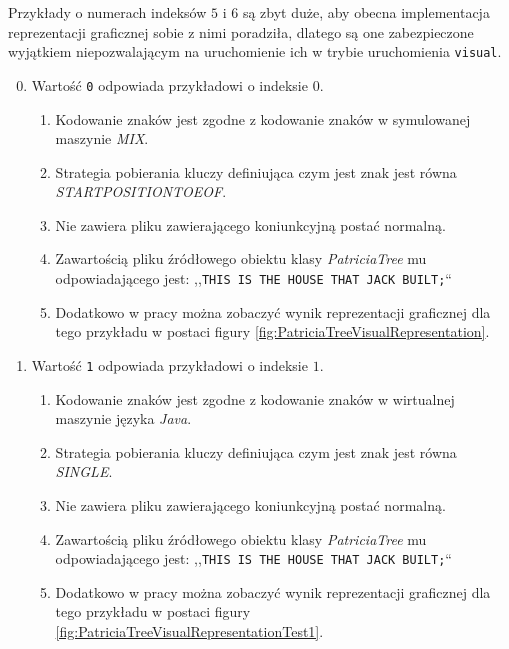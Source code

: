 \begin{enumerate}
            	Przykłady o numerach indeksów $5$ i $6$ są zbyt duże, aby obecna implementacja reprezentacji graficznej sobie z nimi poradziła, dlatego są one zabezpieczone wyjątkiem niepozwalającym na uruchomienie ich w trybie uruchomienia \texttt{visual}.
    	        \begin{enumerate}[label*=\arabic*.]
    	            \setcounter{enumii}{-1}
    	            \item Wartość \texttt{0} odpowiada przykładowi o indeksie $0$.
    	                \begin{enumerate}
    	                    \item Kodowanie znaków jest zgodne z kodowanie znaków w symulowanej maszynie \emph{MIX}.
    	                    \item Strategia pobierania kluczy definiująca czym jest znak jest równa \emph{START\textunderscore POSITION\textunderscore TO\textunderscore EOF}.
    	                    \item Nie zawiera pliku zawierającego koniunkcyjną postać normalną.
    	                    \item Zawartością pliku źródłowego obiektu klasy \emph{PatriciaTree} mu odpowiadającego jest: \newline
    	                ,,\texttt{THIS IS THE HOUSE THAT JACK BUILT;}``
    	                    \item Dodatkowo w pracy można zobaczyć wynik reprezentacji graficznej dla tego przykładu w postaci figury \ref{fig:PatriciaTreeVisualRepresentation}.
    	                \end{enumerate}
    	                
    	            \item Wartość \texttt{1} odpowiada przykładowi o indeksie $1$.
    	                \begin{enumerate}
    	                    \item Kodowanie znaków jest zgodne z kodowanie znaków w wirtualnej maszynie języka \emph{Java}.
    	                    \item Strategia pobierania kluczy definiująca czym jest znak jest równa \emph{SINGLE}.
    	                    \item Nie zawiera pliku zawierającego koniunkcyjną postać normalną.
    	                    \item Zawartością pliku źródłowego obiektu klasy \emph{PatriciaTree} mu odpowiadającego jest: \newline
    	                ,,\texttt{THIS IS THE HOUSE THAT JACK BUILT;}``
    	                    \item Dodatkowo w pracy można zobaczyć wynik reprezentacji graficznej dla tego przykładu w postaci figury \ref{fig:PatriciaTreeVisualRepresentationTest1}.
    	                \end{enumerate}
    	                

\end{enumerate}
\end{enumerate}
